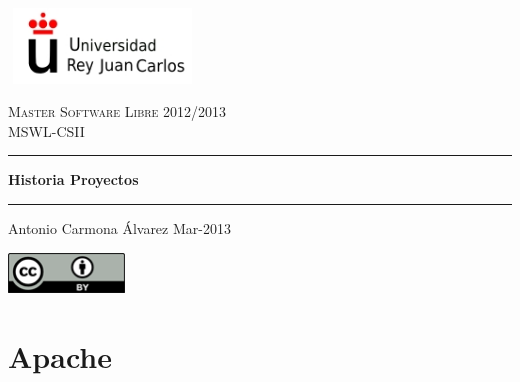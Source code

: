\documentclass[a4paper,oneside,11pt]{article}
\begin{document}
\vspace{5cm}

\begin{titlepage}
\begin{center}
\includegraphics[width=50mm,height=20mm]{logo-urjc.jpg}

\vspace{4cm}
\textsc{\Large Master Software Libre 2012/2013}\\[0.5cm]
\textsc{\Large MSWL-CSII}\\[0.5cm]
\hrule height 2pt
\begin{center}
{ \huge \bfseries Historia Proyectos}
\end{center}
\hrule height 2pt
\vspace{0.4cm}
\begin{minipage}{0.4\textwidth}
\large
\begin{center}
Antonio Carmona \'Alvarez Mar-2013
\end{center} 
\end{minipage}
\vfill
\includegraphics[width=3.1cm,height=1.08cm]{by_petit.png}
{\large}
\end{center}
\end{titlepage}

\newpage
\tableofcontents  %
\newpage

\section{Apache}
\end{document}
